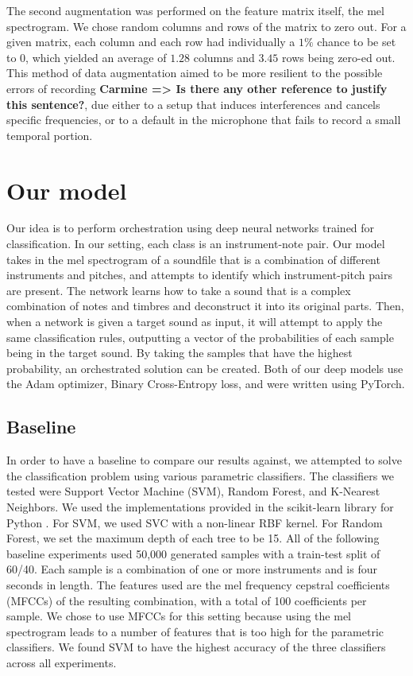 \documentclass{article}
\newcommand{\carmine}[1]{\textbf{\color{red} Carmine => #1}}
\begin{document}
The second augmentation was performed on the feature matrix itself, the mel spectrogram. We chose random columns and rows of the matrix to zero out. For a given matrix, each column and each row had individually a $1\%$ chance to be set to 0, which yielded an average of $1.28$  columns and $3.45$ rows being zero-ed out. This method of data augmentation aimed to be more resilient to the possible errors of recording \carmine{Is there any other reference to justify this sentence?}, due either to a setup that induces interferences and cancels specific frequencies, or to a default in the microphone that fails to record a small temporal portion.

\section{Our model}

Our idea is to perform orchestration using deep neural networks trained for classification. In our setting, each class is an instrument-note pair. Our model takes in the mel spectrogram of a soundfile that is a combination of different instruments and pitches, and attempts to identify which instrument-pitch pairs are present. The network learns how to take a sound that is a complex combination of notes and timbres and deconstruct it into its original parts. Then, when a network is given a target sound as input, it will attempt to apply the same classification rules, outputting a vector of the probabilities of each sample being in the target sound. By taking the samples that have the highest probability, an orchestrated solution can be created. Both of our deep models use the Adam optimizer, Binary Cross-Entropy loss, and were written using PyTorch.

\subsection{Baseline}
In order to have a baseline to compare our results against, we attempted to solve the classification problem using various parametric classifiers. The classifiers we tested were Support Vector Machine (SVM), Random Forest, and K-Nearest Neighbors. We used the implementations provided in the scikit-learn library for Python \cite{scikit-learn}. For SVM, we used SVC with a non-linear RBF kernel. For Random Forest, we set the maximum depth of each tree to be 15.  All of the following baseline experiments used 50,000 generated samples with a train-test split of 60/40. Each sample is a combination of one or more instruments and is four seconds in length. The features used are the mel frequency cepstral coefficients (MFCCs) of the resulting combination, with a total of 100 coefficients per sample. We chose to use MFCCs for this setting because using the mel spectrogram leads to a number of features that is too high for the parametric classifiers. We found SVM to have the highest accuracy of the three classifiers across all experiments.
\end{document}
